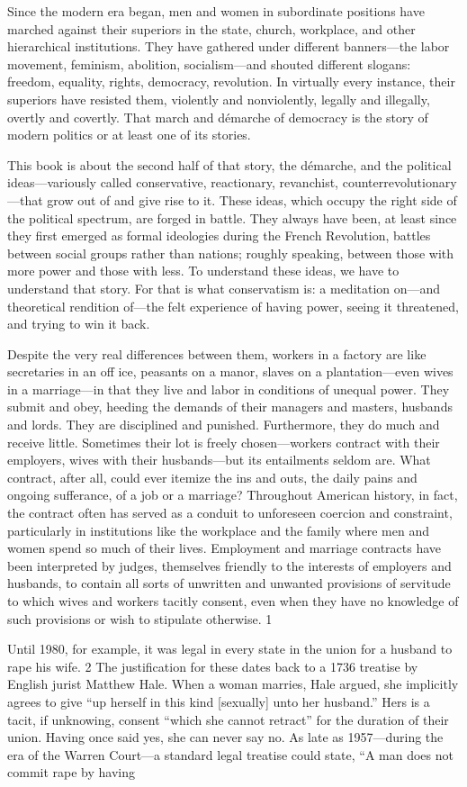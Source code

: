 	Since the modern era began, men and women in subordinate positions have marched against their superiors in the state, church, workplace, and other hierarchical institutions. They have gathered under different banners—the labor movement, feminism, abolition, socialism—and shouted different slogans: freedom, equality, rights, democracy, revolution. In virtually every instance, their superiors have resisted them, violently and nonviolently, legally and illegally, overtly and covertly. That march and démarche of democracy is the story of modern politics or at least one of its stories.{\par} This book is about the second half of that story, the démarche, and the political ideas—variously called conservative, reactionary, revanchist, counterrevolutionary—that grow out of and give rise to it. These ideas, which occupy the right side of the political spectrum, are forged in battle. They always have been, at least since they first emerged as formal ideologies during the French Revolution, battles between social groups rather than nations; roughly speaking, between those with more power and those with less. To understand these ideas, we have to understand that story. For that is what conservatism is: a meditation on—and theoretical rendition of—the felt experience of having power, seeing it threatened, and trying to win it back.{\par} Despite the very real differences between them, workers in a factory are like secretaries in an off ice, peasants on a manor, slaves on a plantation—even wives in a marriage—in that they live and labor in conditions of unequal power. They submit and obey, heeding the demands of their managers and masters, husbands and lords. They are disciplined and punished. Furthermore, they do much and receive little. Sometimes their lot is freely chosen—workers contract with their employers, wives with their husbands—but its entailments seldom are. What contract, after all, could ever itemize the ins and outs, the daily pains and ongoing sufferance, of a job or a marriage? Throughout American history, in fact, the contract often has served as a conduit to unforeseen coercion and constraint, particularly in institutions like the workplace and the family where men and women spend so much of their lives. Employment and marriage contracts have been interpreted by judges, themselves friendly to the interests of employers and husbands, to contain all sorts of unwritten and unwanted provisions of servitude to which wives and workers tacitly consent, even when they have no knowledge of such provisions or wish to stipulate otherwise. {\color{blue} 1 } {\par} Until 1980, for example, it was legal in every state in the union for a husband to rape his wife. {\color{blue} 2 } The justification for these dates back to a 1736 treatise by English jurist Matthew Hale. When a woman marries, Hale argued, she implicitly agrees to give “up herself in this kind [sexually] unto her husband.” Hers is a tacit, if unknowing, consent “which she cannot retract” for the duration of their union. Having once said yes, she can never say no. As late as 1957—during the era of the Warren Court—a standard legal treatise could state, “A man does not commit rape by having 